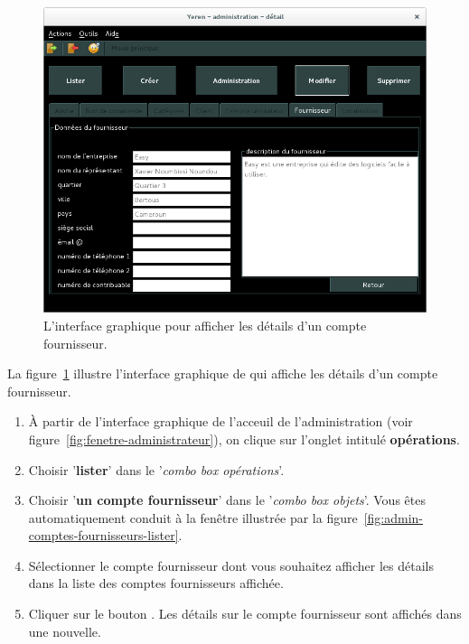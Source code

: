 

\begin{figure}[!htpb]
	\centering
	\includegraphics[scale=0.45]{images/compte-fournisseur-afficher-details.png}
	\caption{L'interface graphique pour afficher les d\'etails
			d'un compte fournisseur.}
	\label{fig:admin-fournisseurs-afficher-details}
\end{figure}

La figure~\ref{fig:admin-fournisseurs-afficher-details}
illustre l'interface graphique de \yeroth qui affiche
les d\'etails d'un compte fournisseur.

\begin{enumerate}[1)]
	\item \`A partir de l'interface graphique de l'acceuil de
		l'administration (voir figure~\ref{fig:fenetre-administrateur}),
		on clique sur l'onglet intitul\'e \textbf{op\'erations}. 
		
	\item Choisir '\textbf{lister}' dans le '\emph{combo box
		op\'erations}'.
		
	\item Choisir '\textbf{un compte fournisseur}' dans le
		'\emph{combo box objets}'. Vous \^etes automatiquement
		conduit \`a la fen\^etre illustr\'ee par la
		figure~\ref{fig:admin-comptes-fournisseurs-lister}.
		
	\item S\'electionner le compte fournisseur dont vous
		souhaitez afficher les d\'etails dans la liste des
		comptes fournisseurs affich\'ee.
		
	\item Cliquer sur le bouton . Les d\'etails
		sur le compte fournisseur sont affich\'es dans une nouvelle.
\end{enumerate}

